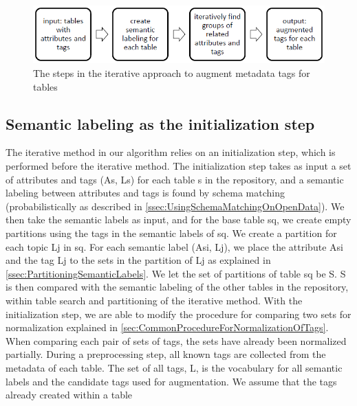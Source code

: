 \begin{figure}
    \centering
    \includegraphics[width=5in]{figures/the-steps-iterative-approach.png}
    \caption{The steps in the iterative approach to augment metadata tags for tables}
    \label{fig:the-steps-iterative-approach}
\end{figure}

\subsection{Semantic labeling as the initialization step}
\label{ssec:SemanticLabelingAsTheInitializationStep}

The iterative method in our algorithm relies on an initialization step, which is performed before the iterative method. The initialization step takes as input a set of attributes and tags (As, Ls) for each table s in the repository, and a semantic labeling between attributes and tags is found by schema matching (probabilistically as described in \autoref{ssec:UsingSchemaMatchingOnOpenData}). We then take the semantic labels as input, and for the base table sq, we create empty partitions using the tags in the semantic labels of sq. We create a partition for each topic Lj in sq. For each semantic label (Asi, Lj), we place the attribute Asi and the tag Lj to the sets in the partition of Lj as explained in \autoref{ssec:PartitioningSemanticLabels}. We let the set of partitions of table sq be S. S is then compared with the semantic labeling of the other tables in the repository, within table search and partitioning of the iterative method.
With the initialization step, we are able to modify the procedure for comparing two sets for normalization explained in \autoref{sec:CommonProcedureForNormalizationOfTags}. When comparing each pair of sets of tags, the sets have already been normalized partially. During a preprocessing step, all known tags are collected from the metadata of each table. The set of all tags, L, is the vocabulary for all semantic labels and the candidate tags used for augmentation. We assume that the tags already created within a table

